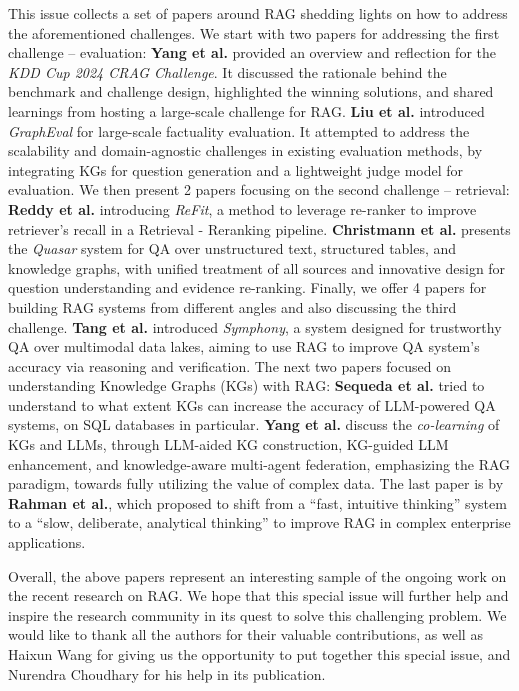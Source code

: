 \documentclass[11pt]{article}
\begin{document}
This issue collects a set of papers around RAG shedding lights on how to address the aforementioned challenges. We start with two papers for addressing the first challenge – evaluation: {\bf Yang et al.} provided an overview and reflection for the {\it KDD Cup 2024 CRAG Challenge}. It discussed the rationale behind the benchmark and challenge design, highlighted the winning solutions, and shared learnings from hosting a large-scale challenge for RAG. {\bf Liu et al.} introduced {\it GraphEval} for large-scale factuality evaluation. It attempted to address the scalability and domain-agnostic challenges in existing evaluation methods, by integrating KGs for question generation and a lightweight judge model for evaluation. We then present 2 papers focusing on the second challenge – retrieval: {\bf Reddy et al.} introducing {\it ReFit}, a method to leverage re-ranker to improve retriever’s recall in a Retrieval - Reranking pipeline. {\bf Christmann et al.} presents the {\it Quasar} system for QA over unstructured text, structured tables, and knowledge graphs, with unified treatment of all sources and innovative design for question understanding and evidence re-ranking. Finally, we offer 4 papers for building RAG systems from different angles and also discussing the third challenge. {\bf Tang et al.} introduced {\it Symphony}, a system designed for trustworthy QA over multimodal data lakes, aiming to use RAG to improve QA system’s accuracy via reasoning and verification. The next two papers focused on understanding Knowledge Graphs (KGs) with RAG: {\bf Sequeda et al.} tried to understand to what extent KGs can increase the accuracy of LLM-powered QA systems, on SQL databases in particular. {\bf Yang et al.} discuss the {\it co-learning} of KGs and LLMs, through LLM-aided KG construction, KG-guided LLM enhancement, and knowledge-aware multi-agent federation, emphasizing the RAG paradigm, towards fully utilizing the value of complex data. The last paper is by {\bf Rahman et al.}, which proposed to shift from a “fast, intuitive thinking” system to a “slow, deliberate, analytical thinking” to improve RAG in complex enterprise applications. 

Overall, the above papers represent an interesting sample of the ongoing work on the recent research on RAG. We hope that this special issue will further help and inspire the research community in its quest to solve this challenging problem. We would like to thank all the authors for their valuable contributions, as well as Haixun Wang for giving us the opportunity to put together this special issue, and Nurendra Choudhary for his help in its publication.
\end{document}
